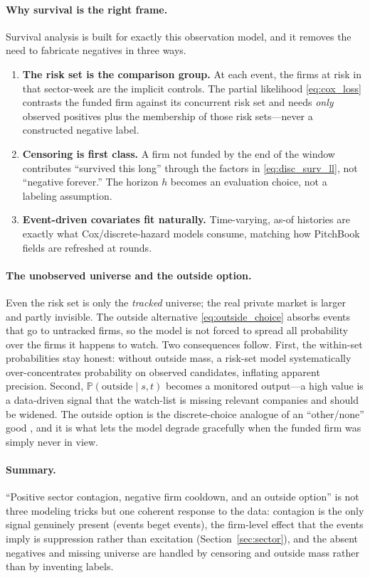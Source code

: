 \documentclass[11pt]{article}
\theoremstyle{plain}
\theoremstyle{definition}
\theoremstyle{remark}
\newcommand{\Prob}{\mathbb{P}}
\begin{document}
\paragraph{Why survival is the right frame.}
Survival analysis is built for exactly this observation model, and it removes the need to fabricate negatives in three ways.
\begin{enumerate}[leftmargin=1.5em,itemsep=2pt]
\item \textbf{The risk set is the comparison group.} At each event, the firms at risk in that sector-week are the implicit controls. The partial likelihood \eqref{eq:cox_loss} contrasts the funded firm against its concurrent risk set and needs \emph{only} observed positives plus the membership of those risk sets---never a constructed negative label.
\item \textbf{Censoring is first class.} A firm not funded by the end of the window contributes ``survived this long'' through the factors in \eqref{eq:disc_surv_ll}, not ``negative forever.'' The horizon $h$ becomes an evaluation choice, not a labeling assumption.
\item \textbf{Event-driven covariates fit naturally.} Time-varying, as-of histories are exactly what Cox/discrete-hazard models consume, matching how PitchBook fields are refreshed at rounds.
\end{enumerate}

\paragraph{The unobserved universe and the outside option.}
Even the risk set is only the \emph{tracked} universe; the real private market is larger and partly invisible. The outside alternative \eqref{eq:outside_choice} absorbs events that go to untracked firms, so the model is not forced to spread all probability over the firms it happens to watch. Two consequences follow. First, the within-set probabilities stay honest: without outside mass, a risk-set model systematically over-concentrates probability on observed candidates, inflating apparent precision. Second, $\Prob(\text{outside}\mid s,t)$ becomes a monitored output---a high value is a data-driven signal that the watch-list is missing relevant companies and should be widened. The outside option is the discrete-choice analogue of an ``other/none'' good \citep{mcfadden1974}, and it is what lets the model degrade gracefully when the funded firm was simply never in view.

\paragraph{Summary.}
``Positive sector contagion, negative firm cooldown, and an outside option'' is not three modeling tricks but one coherent response to the data: contagion is the only signal genuinely present (events beget events), the firm-level effect that the events imply is suppression rather than excitation (Section~\ref{sec:sector}), and the absent negatives and missing universe are handled by censoring and outside mass rather than by inventing labels.
\end{document}

